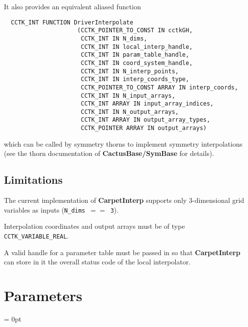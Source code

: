 It also provides an equivalent aliased function
\begin{verbatim}
  CCTK_INT FUNCTION DriverInterpolate
                     (CCTK_POINTER_TO_CONST IN cctkGH,
                      CCTK_INT IN N_dims,
                      CCTK_INT IN local_interp_handle,
                      CCTK_INT IN param_table_handle,
                      CCTK_INT IN coord_system_handle,
                      CCTK_INT IN N_interp_points,
                      CCTK_INT IN interp_coords_type,
                      CCTK_POINTER_TO_CONST ARRAY IN interp_coords,
                      CCTK_INT IN N_input_arrays,
                      CCTK_INT ARRAY IN input_array_indices,
                      CCTK_INT IN N_output_arrays,
                      CCTK_INT ARRAY IN output_array_types,
                      CCTK_POINTER ARRAY IN output_arrays)
\end{verbatim}
which can be called by symmetry thorns to implement symmetry interpolations
(see the thorn documentation of {\bf CactusBase/SymBase} for details).


\subsection{Limitations}

The current implementation of {\bf CarpetInterp} supports only 3-dimensional
grid variables as inputs ({\tt N\_dims $==$ 3}).

Interpolation coordinates and output arrays must be of type
{\tt CCTK\_VARIABLE\_REAL}.

A valid handle for a parameter table must be passed in so that {\bf CarpetInterp}
can store in it the overall status code of the local interpolator.





\section{Parameters} 


\parskip = 0pt

\setlength{\tableWidth}{160mm}

\setlength{\paraWidth}{\tableWidth}
\setlength{\descWidth}{\tableWidth}
\settowidth{\maxVarWidth}{check\_tree\_search}

\addtolength{\paraWidth}{-\maxVarWidth}
\addtolength{\paraWidth}{-\columnsep}
\addtolength{\paraWidth}{-\columnsep}
\addtolength{\paraWidth}{-\columnsep}

